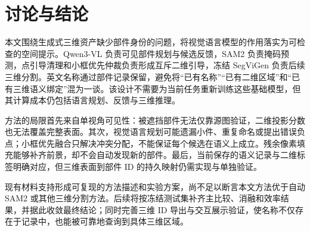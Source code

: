 \section{讨论与结论}
\label{sec:conclusion}
本文围绕生成式三维资产缺少部件身份的问题，将视觉语言模型的作用落实为可检查的空间提示。Qwen3-VL 负责可见部件规划与候选反馈，SAM2 负责掩码预测，点引导清理和小框优先仲裁负责形成互斥二维引导，冻结 SegViGen 负责后续三维分割。英文名称通过部件记录保留，避免将“已有名称”“已有二维区域”和“已有三维语义绑定”混为一谈。该设计不需要为当前任务重新训练这些基础模型，但其计算成本仍包括语言规划、反馈与三维推理。

方法的局限首先来自单视角可见性：被遮挡部件无法仅靠源图验证，二维投影分数也无法覆盖完整表面。其次，视觉语言规划可能遗漏小件、重复命名或提出错误负点；小框优先融合只解决冲突分配，不能保证每个候选在语义上成立。残余像素填充能够补齐前景，却不会自动发现新的部件。最后，当前保存的语义记录与二维标签明确对应，但三维表面到部件 ID 的持久映射仍需实现与单独验证。

现有材料支持形成可复现的方法描述和实验方案，尚不足以断言本文方法优于自动 SAM2 或其他三维分割方法。后续将按冻结测试集补齐主比较、消融和效率结果，并据此收敛最终结论；同时完善三维 ID 导出与交互展示验证，使名称不仅存在于记录中，也能被可靠地查询到具体三维区域。

